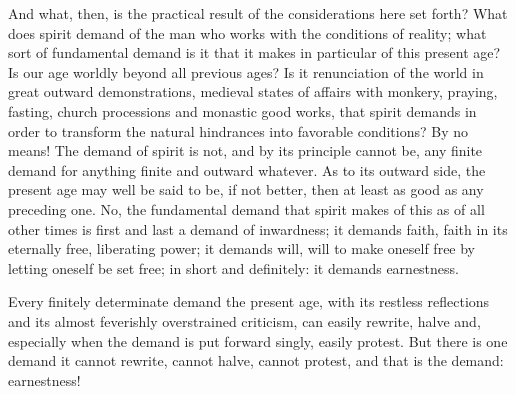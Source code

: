 \documentclass[12pt]{book}
\begin{document}
And what, then, is the practical result of the considerations here set
forth? What does spirit demand of the man who works with the conditions
of reality; what sort of fundamental demand is it that it makes in
particular of this present age? Is our age worldly beyond all previous
ages? Is it renunciation of the world in great outward demonstrations,
medieval states of affairs with monkery, praying, fasting, church
processions and monastic good works, that spirit demands in order to
transform the natural hindrances into favorable conditions? By no means!
The demand of spirit is not, and by its principle cannot be, any finite
demand for anything finite and outward whatever. As to its outward
side, the present age may well be said to be, if not better, then at
least as good as any preceding one. No, the fundamental demand that
spirit makes of this as of all other times is first and last a demand
of inwardness; it demands faith, faith in its eternally free, liberating
power; it demands will, will to make oneself free by letting oneself be
set free; in short and definitely: it demands earnestness.

Every finitely determinate demand the present age, with its restless
reflections and its almost feverishly overstrained criticism, can easily
rewrite, halve and, especially when the demand is put forward singly,
easily protest. But there is one demand it cannot rewrite, cannot halve,
cannot protest, and that is the demand: earnestness!
\end{document}
